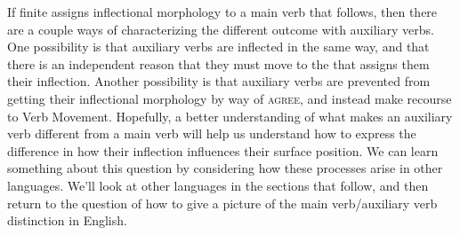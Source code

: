 If finite  assigns inflectional morphology to a main verb that follows, then there are a couple ways of characterizing the different outcome with auxiliary verbs. One possibility is that auxiliary verbs are inflected in the same way, and that there is an independent reason that they must move to the  that assigns them their inflection. Another possibility is that auxiliary verbs are prevented from getting their inflectional morphology by way of \textsc{agree}, and instead make recourse to Verb Movement. Hopefully, a better understanding of what makes an auxiliary verb different from a main verb will help us understand how to express the difference in how their inflection influences their surface position. We can learn something about this question by considering how these processes arise in other languages. We'll look at other languages in the sections that follow, and then return to the question of how to give a picture of the main verb/auxiliary verb distinction in English.

